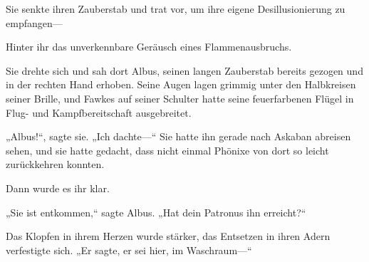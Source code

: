 Sie senkte ihren Zauberstab und trat vor, um ihre eigene Desillusionierung zu empfangen—

Hinter ihr das unverkennbare Geräusch eines Flammenausbruchs.

Sie drehte sich und sah dort Albus, seinen langen Zauberstab bereits gezogen und in der rechten Hand erhoben. Seine Augen lagen grimmig unter den Halbkreisen seiner Brille, und Fawkes auf seiner Schulter hatte seine feuerfarbenen Flügel in Flug- und Kampfbereitschaft ausgebreitet.

„Albus!“, sagte sie. „Ich dachte—“ Sie hatte ihn gerade nach Askaban abreisen sehen, und sie hatte gedacht, dass nicht einmal Phönixe von dort so leicht zurückkehren konnten.

Dann wurde es ihr klar.

„Sie ist entkommen,“ sagte Albus. „Hat dein Patronus ihn erreicht?“

Das Klopfen in ihrem Herzen wurde stärker, das Entsetzen in ihren Adern verfestigte sich. „Er sagte, er sei hier, im Waschraum—“


